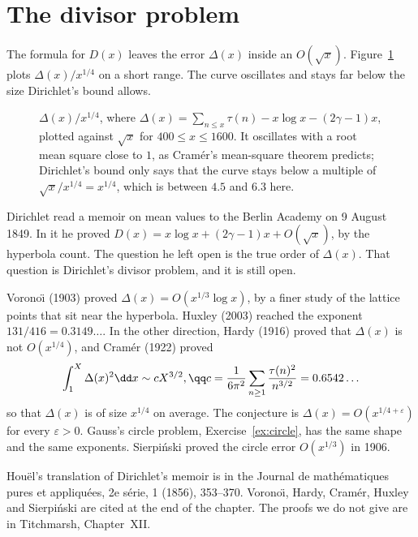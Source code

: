 \section{The divisor problem}

The formula for $D(x)$ leaves the error $\Delta(x)$ inside an $O(\sqrt x)$. Figure~\ref{fig:divisorerr} plots $\Delta(x)/x^{1/4}$ on a short range. The curve oscillates and stays far below the size Dirichlet's bound allows.

\begin{figure}[ht]
\centering
{}
\caption{$\Delta(x)/x^{1/4}$, where $\Delta(x)=\sum_{n\le x}\tau(n)-x\log x-(2\gamma-1)x$, plotted against $\sqrt x$ for $400\le x\le1600$. It oscillates
with a root mean square close to $1$, as Cram\'er's mean-square theorem predicts; Dirichlet's bound only says that the curve stays below a multiple of
$\sqrt x/x^{1/4}=x^{1/4}$, which is between $4.5$ and $6.3$ here.}
\label{fig:divisorerr}
\end{figure}

\begin{remark}
Dirichlet read a memoir on mean values to the Berlin Academy on 9 August 1849. In it he proved $D(x)=x\log x+(2\gamma-1)x+O(\sqrt x)$, by the hyperbola count. The question he left open is the true order of $\Delta(x)$. That question is Dirichlet's divisor problem, and it is still open.

Vorono\"\i{} (1903) proved $\Delta(x)=O(x^{1/3}\log x)$, by a finer study of the lattice points that sit near the hyperbola. Huxley (2003) reached the exponent $131/416=0.3149\ldots$. In the other direction, Hardy (1916) proved that $\Delta(x)$ is not $O(x^{1/4})$, and Cram\'er (1922) proved
\[
\begin{gathered}\int_1^X\Delta(x)^2\dd x\sim cX^{3/2},\qq c=\frac1{6\pi^2}\sum_{n\ge1}\frac{\tau(n)^2}{n^{3/2}}=0.6542\ldots\end{gathered}
\]
so that $\Delta(x)$ is of size $x^{1/4}$ on average. The conjecture is $\Delta(x)=O(x^{1/4+\varepsilon})$ for every $\varepsilon>0$. Gauss's circle problem, Exercise~\ref{ex:circle}, has the same shape and the same exponents. Sierpi\'nski proved the circle error $O(x^{1/3})$ in 1906.

Hou\"el's translation of Dirichlet's memoir is in the Journal de math\'ematiques pures et appliqu\'ees, 2e s\'erie, 1 (1856), 353--370. Vorono\"\i, Hardy, Cram\'er, Huxley and Sierpi\'nski are cited at the end of the chapter. The proofs we do not give are in Titchmarsh, Chapter~XII.
\end{remark}

